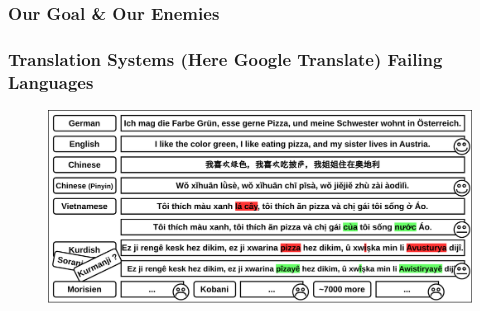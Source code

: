 \documentclass[aspectratio=169]{beamer}
\begin{document}
\begin{frame}[fragile]
\begin{figure}
        \hfill
        \hfill
        \hfill
        \hfill
        \hfill
        \hfill
    \end{figure}
\end{frame}

\begin{frame}[fragile]
	\frametitle{Our Goal \& Our Enemies}
\end{frame}

\begin{frame}[fragile]
	\frametitle{Translation Systems (Here Google Translate) Failing Languages}
    \begin{figure}
	    \centering
	    \includegraphics[width=1.0\textwidth]{images/CRAMT-Tool-MotivationSimpleMore.png}
	\end{figure}
\end{frame}
\end{document}
